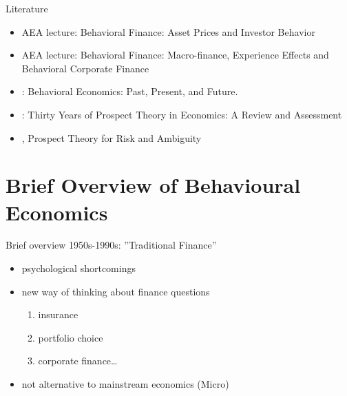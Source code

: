 \documentclass[11pt, aspectratio=169]{beamer}
\begin{document}



\begin{frame}{Literature}
    \begin{itemize}
        \item \citet{Barberis2017Talk} AEA lecture: Behavioral Finance: Asset Prices and Investor Behavior\bigskip
        \item \citet{Malmendier2017Talk} AEA lecture: Behavioral Finance: Macro-finance, Experience Effects and Behavioral Corporate Finance\bigskip
        \item \citet{Thaler2016}:  Behavioral Economics: Past, Present, and Future.\bigskip
        \item \citet{Barberis2013a}: Thirty Years of Prospect Theory in Economics: A Review and Assessment\bigskip
        \item \citet{Wakker2010}, Prospect Theory for Risk and Ambiguity\bigskip
	\end{itemize}
\end{frame}

\section{Brief Overview of Behavioural Economics}
\begin{frame}{Brief overview}
    1950s-1990s: ''Traditional Finance''\bigskip
\begin{itemize}
	\item psychological shortcomings \bigskip
    \item new way of thinking about finance questions\bigskip
        \begin{enumerate}
            \item insurance\medskip
            \item portfolio choice\medskip
            \item corporate finance\ldots
            \medskip
        \end{enumerate}
    \item not alternative to mainstream economics (Micro)\bigskip
\end{itemize}
\end{frame}
\end{document}
